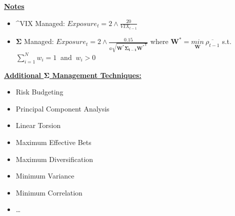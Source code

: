 \documentclass[6pt]{article}
\begin{document}
\underline{\textbf{Notes}}

\begin{itemize}
  \item \^{}VIX Managed: $Exposure_{t}=2 \wedge \frac{20}{VIX_{t-1}}$
  \item $\mathbf{\Sigma}$ Managed: $Exposure_{t}=2 \wedge \frac{0.15}{a\sqrt{\mathbf{W^*}\mathbf{\Sigma_{t-1}}\mathbf{W^*}^\mathsf{T}}}$ 
    where $\mathbf{W^*}=\underset{\mathbf{W}}{min}\ \overline{\rho_{t-1}}$ s.t. $\sum_{i=1}^N w_{i}=1\ $ and $\ w_{i}>0$
\end{itemize}


\underline{\textbf{Additional $\mathbf{\Sigma}$ Management Techniques:}} \\
\begin{itemize}
  \item Risk Budgeting
  \item Principal Component Analysis
  \item Linear Torsion
  \item Maximum Effective Bets
  \item Maximum Diversification
  \item Minimum Variance 
  \item Minimum Correlation
  \item \ldots
\end{itemize}
\end{document}
